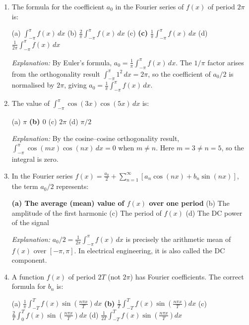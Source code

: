 \documentclass[12pt,a4paper]{article}
\begin{document}
\begin{enumerate}[label=\textbf{MCQ \arabic*.}]

\item The formula for the coefficient $a_0$ in the Fourier series of $f(x)$ of period $2\pi$ is:

(a) $\displaystyle\int_{-\pi}^{\pi}f(x)\,dx$ \quad
(b) $\displaystyle\frac{2}{\pi}\int_{-\pi}^{\pi}f(x)\,dx$ \quad
(c) \textbf{(c)}\; $\displaystyle\frac{1}{\pi}\int_{-\pi}^{\pi}f(x)\,dx$ \quad
(d) $\displaystyle\frac{1}{2\pi}\int_{-\pi}^{\pi}f(x)\,dx$

\textit{Explanation:} By Euler's formula, $a_0 = \frac{1}{\pi}\int_{-\pi}^{\pi}f(x)\,dx$. The $1/\pi$ factor arises from the orthogonality result $\int_{-\pi}^{\pi}1^2\,dx = 2\pi$, so the coefficient of $a_0/2$ is normalised by $2\pi$, giving $a_0 = \frac{1}{\pi}\int_{-\pi}^{\pi}f(x)\,dx$.

\item The value of $\displaystyle\int_{-\pi}^{\pi}\cos(3x)\cos(5x)\,dx$ is:

(a) $\pi$ \quad \textbf{(b) $0$} \quad (c) $2\pi$ \quad (d) $\pi/2$

\textit{Explanation:} By the cosine--cosine orthogonality result, $\int_{-\pi}^{\pi}\cos(mx)\cos(nx)\,dx = 0$ when $m \ne n$. Here $m=3 \ne n=5$, so the integral is zero.

\item In the Fourier series $f(x) = \frac{a_0}{2} + \sum_{n=1}^{\infty}[a_n\cos(nx) + b_n\sin(nx)]$, the term $a_0/2$ represents:

\textbf{(a) The average (mean) value of $f(x)$ over one period} \quad
(b) The amplitude of the first harmonic \quad
(c) The period of $f(x)$ \quad
(d) The DC power of the signal

\textit{Explanation:} $a_0/2 = \frac{1}{2\pi}\int_{-\pi}^{\pi}f(x)\,dx$ is precisely the arithmetic mean of $f(x)$ over $[-\pi,\pi]$. In electrical engineering, it is also called the DC component.

\item A function $f(x)$ of period $2T$ (not $2\pi$) has Fourier coefficients. The correct formula for $b_n$ is:

(a) $\displaystyle\frac{1}{\pi}\int_{-T}^{T}f(x)\sin\!\left(\frac{n\pi x}{T}\right)dx$ \quad
\textbf{(b)} $\displaystyle\frac{1}{T}\int_{-T}^{T}f(x)\sin\!\left(\frac{n\pi x}{T}\right)dx$ \quad
(c) $\displaystyle\frac{2}{T}\int_{0}^{T}f(x)\sin\!\left(\frac{n\pi x}{T}\right)dx$ \quad
(d) $\displaystyle\frac{1}{2T}\int_{-T}^{T}f(x)\sin\!\left(\frac{n\pi x}{T}\right)dx$


\end{enumerate}
\end{document}

